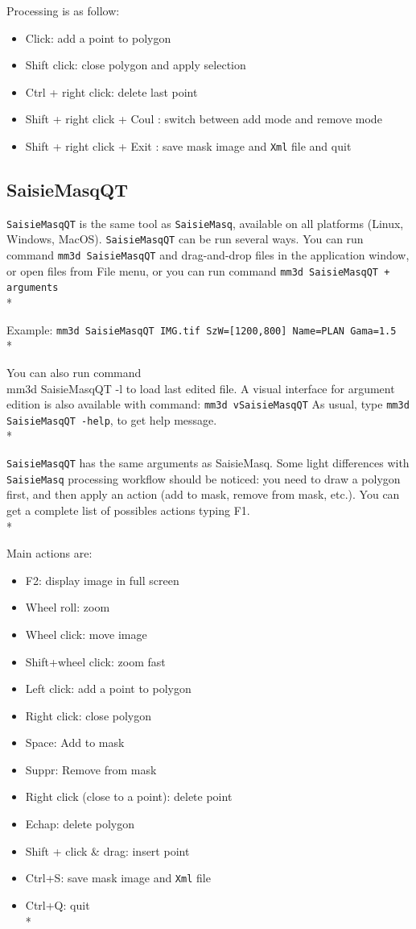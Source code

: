 Processing is as follow:
\begin{itemize}
\item Click: add a point to polygon
\item Shift click: close polygon and apply selection
\item Ctrl + right click: delete last point
\item Shift + right click + Coul : switch between add mode and remove mode
\item Shift + right click + Exit : save mask image and {\tt Xml} file and quit
\end{itemize}

\subsection{SaisieMasqQT}

{\tt SaisieMasqQT} is the same tool as {\tt SaisieMasq}, available on all platforms (Linux, Windows, MacOS).
{\tt SaisieMasqQT} can be run several ways. You can run command {\tt mm3d SaisieMasqQT} and drag-and-drop files in the application window, or open files from File menu, or you can run command {\tt mm3d SaisieMasqQT + arguments}\\*

Example: {\tt mm3d SaisieMasqQT IMG.tif SzW=[1200,800] Name=PLAN Gama=1.5}\\*

You can also run command {\\ mm3d SaisieMasqQT -l} to load last edited file.
A visual interface for argument edition is also available with command: {\tt mm3d vSaisieMasqQT}
As usual, type {\tt mm3d SaisieMasqQT -help}, to get help message.\\*

{\tt SaisieMasqQT} has the same arguments as SaisieMasq. Some light differences with {\tt SaisieMasq} processing workflow should be noticed:
you need to draw a polygon first, and then apply an action (add to mask, remove from mask, etc.).
You can get a complete list of possibles actions typing F1.\\*

Main actions are:
\begin{itemize}
\item F2: display image in full screen
\item Wheel roll: zoom
\item Wheel click: move image
\item Shift+wheel click: zoom fast
\item Left click: add a point to polygon
\item Right click: close polygon
\item Space: Add to mask
\item Suppr: Remove from mask
\item Right click (close to a point): delete point
\item Echap: delete polygon
\item Shift + click \& drag: insert point
\item Ctrl+S: save mask image and {\tt Xml} file
\item Ctrl+Q: quit\\*
\end{itemize}

